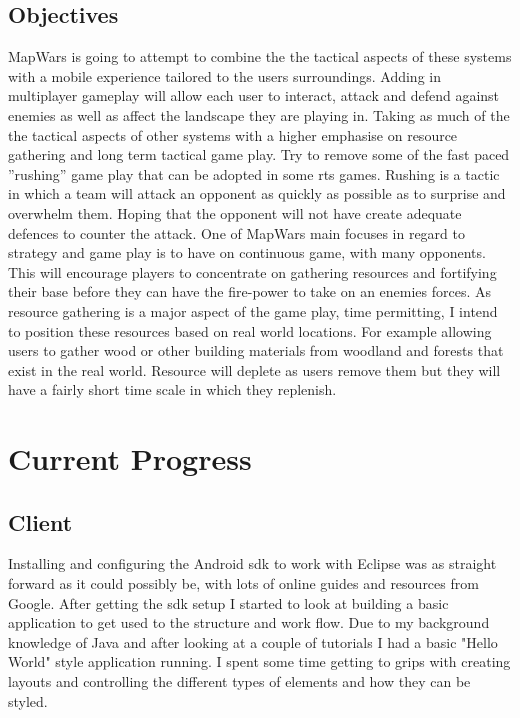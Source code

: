 \documentclass[11pt,fleqn,twoside]{article}
\begin{document}
\subsection{Objectives}
MapWars is going to attempt to combine the the tactical aspects of these systems with a mobile experience tailored to the users surroundings. Adding in multiplayer gameplay will allow each user to interact, attack and defend against enemies as well as affect the landscape they are playing in. Taking as much of the the tactical aspects of other systems with a higher emphasise on resource gathering and long term tactical game play. Try to remove some of the fast paced ”rushing” game play that can be adopted in some \gls{rts} games. Rushing is a tactic in which a team will attack an opponent as quickly as possible as to surprise and overwhelm them. Hoping that the opponent will not have create adequate defences to counter the attack. One of MapWars main focuses in regard to strategy and game play is to have on continuous game, with many opponents. This will encourage players to concentrate on gathering resources and fortifying their base before they can have the fire-power to take on an enemies forces. As resource gathering is a major aspect of the game play, time permitting, I intend to position these resources based on real world locations. For example allowing users to gather wood or other building materials from woodland and forests that exist in the real world. Resource will deplete as users remove them but they will have a fairly short time scale in which they replenish.


\section{Current Progress}
\subsection{Client}
Installing and configuring the Android \gls{sdk} to work with Eclipse was as straight forward as it could possibly be, with lots of online guides and resources from Google. After getting the \gls{sdk} setup I started to look at building a basic application to get used to the structure and work flow. Due to my background knowledge of Java and after looking at a couple of tutorials I had a basic "Hello World" style application running. I spent some time getting to grips with creating layouts and controlling the different types of elements and how they can be styled.
\end{document}
